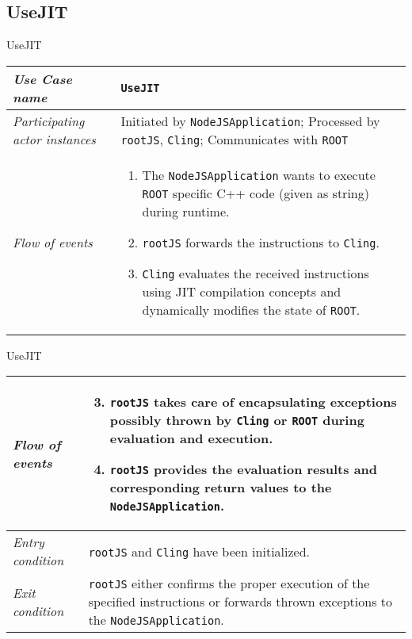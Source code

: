 \subsection{UseJIT}
\begin{frame}{UseJIT}
        \begin{longtable}{p{3cm} @{\hskip 1cm} p{7cm}}
                \hline

                \textit{Use Case name} & \texttt{UseJIT}\\
                \hline

                \textit{Participating actor instances} & Initiated by \texttt{NodeJSApplication}; Processed by \texttt{rootJS}, \texttt{Cling}; Communicates with \texttt{ROOT}\\
                \hline

                \textit{Flow of events} &
                        \begin{enumerate}
                                \item The \texttt{NodeJSApplication} wants to execute \texttt{ROOT} specific C++ code (given as string) during runtime.
                                \item \texttt{rootJS} forwards the instructions to \texttt{Cling}.
                                \item \texttt{Cling} evaluates the received instructions using JIT compilation concepts and dynamically modifies the state of \texttt{ROOT}.
                        \end{enumerate}
                        \\
        \end{longtable}
\end{frame}
\begin{frame}[t]{UseJIT}
        \begin{longtable}{p{3cm} @{\hskip 1cm} p{7cm}}
                \textit{Flow of events} &
                        \begin{enumerate}
                                \setcounter{enumi}{2}
                                \item \texttt{rootJS} takes care of encapsulating exceptions possibly thrown by \texttt{Cling} or \texttt{ROOT} during evaluation and execution.
                                \item \texttt{rootJS} provides the evaluation results and corresponding return values to the \texttt{NodeJSApplication}.
                        \end{enumerate}
                        \\
                \hline

                \textit{Entry condition} & \texttt{rootJS} and \texttt{Cling} have been initialized.\\
                \hline

                \textit{Exit condition} & \texttt{rootJS} either confirms the proper execution of the specified instructions or forwards thrown exceptions to the \texttt{NodeJSApplication}.\\
                \hline
        \end{longtable}
\end{frame}
